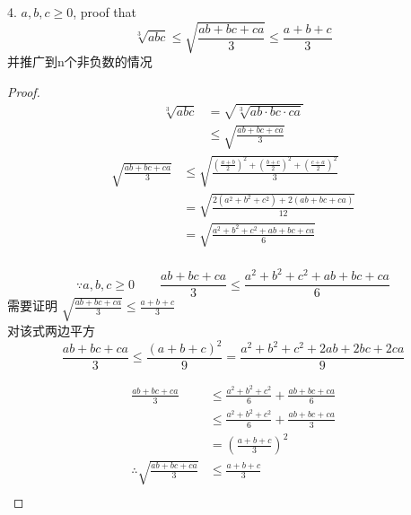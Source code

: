 \documentclass[10pt,a4paper]{book}
\begin{document}
	
	4. $ a,b,c \ge 0 $, proof that
	\begin{equation}
		\sqrt[3]{abc}\le \sqrt{\frac{ab+bc+ca}{3}}\le\frac{a+b+c}{3}
	\end{equation}
	并推广到n个非负数的情况
	\begin{proof}
		\\
		\begin{equation}
			\begin{aligned}
				\sqrt[3]{abc} &=\sqrt{\sqrt[3]{ab\cdot bc\cdot ca}}\\
				&\le \sqrt{\frac{ab+bc+ca}{3}}
			\end{aligned}
		\end{equation}
		\begin{equation}
			\begin{aligned}
				\sqrt{\frac{ab+bc+ca}{3}} &\le \sqrt{\frac{
						(\frac{a+b}{2})^2+
						(\frac{b+c}{2})^2+
						(\frac{c+a}{2})^2
					}{3}}\\
				&=\sqrt{\frac{2(a^2+b^2+c^2)+2(ab+bc+ca)}{12}}\\
				&=\sqrt{\frac{a^2+b^2+c^2+ab+bc+ca}{6}}\\				
			\end{aligned}
		\end{equation}
	
	\begin{equation}
		\because a,b,c \ge 0 \qquad 	\frac{ab+bc+ca}{3} \le \frac{a^2+b^2+c^2+ab+bc+ca}{6}
	\end{equation}
	需要证明 $ \sqrt{\frac{ab+bc+ca}{3}}\le\frac{a+b+c}{3} $\\
	对该式两边平方
	\begin{equation}
		{\frac{ab+bc+ca}{3}}\le\frac{(a+b+c)^2}{9} = \frac{a^2+b^2+c^2 + 2ab+2bc+2ca}{9}
	\end{equation}
	
	\begin{equation}
		\begin{aligned}
			\frac{ab+bc+ca}{3}  &\le \frac{a^2+b^2+c^2}{6} + \frac{ab+bc+ca}{6}\\
								&\le \frac{a^2+b^2+c^2}{6} + \frac{ab+bc+ca}{3}\\
								&= (\frac{a+b+c}{3})^2 \\
			\therefore 	\sqrt{\frac{ab+bc+ca}{3}}  &\le  \frac{a+b+c}{3}\\
		\end{aligned}
	\end{equation}

	\end{proof}
	
\end{document}
